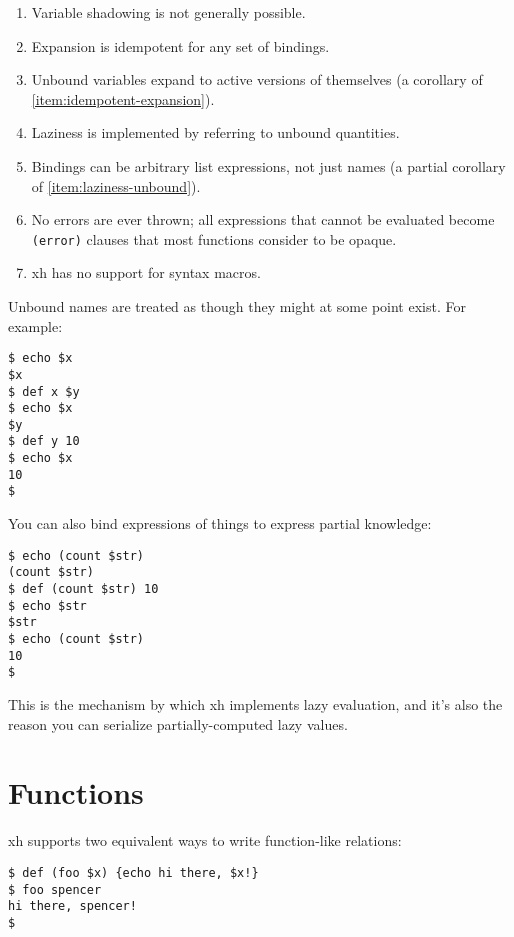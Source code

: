 \documentclass{report}
\begin{document}
\begin{enumerate}
\item{Variable shadowing is not generally possible.}
       \label{item:no-variable-shadowing}
\item{Expansion is idempotent for any set of bindings.}
       \label{item:idempotent-expansion}
\item{Unbound variables expand to active versions of themselves (a}
       corollary of \ref{item:idempotent-expansion}).
       \label{item:unbound-expansion}
\item{Laziness is implemented by referring to unbound quantities.}
       \label{item:laziness-unbound}
\item{Bindings can be arbitrary list expressions, not just names (a}
       partial corollary of \ref{item:laziness-unbound}).
       \label{item:arbitrary-bindings}
\item{No errors are ever thrown; all expressions that cannot be evaluated}
       become \verb|(error)| clauses that most functions consider to be
       opaque.
       \label{item:no-errors}
\item{xh has no support for syntax macros.}
       \label{item:no-macros}
\end{enumerate}

  Unbound names are treated as though they might at some point exist. For
  example:

\begin{verbatim}
$ echo $x
$x
$ def x $y
$ echo $x
$y
$ def y 10
$ echo $x
10
$
\end{verbatim}

  You can also bind expressions of things to express partial knowledge:

\begin{verbatim}
$ echo (count $str)
(count $str)
$ def (count $str) 10
$ echo $str
$str
$ echo (count $str)
10
$
\end{verbatim}

  This is the mechanism by which xh implements lazy evaluation, and it's also
  the reason you can serialize partially-computed lazy values.

\chapter{Functions}\label{chp:functions}
  xh supports two equivalent ways to write function-like relations:

\begin{verbatim}
$ def (foo $x) {echo hi there, $x!}
$ foo spencer
hi there, spencer!
$
\end{verbatim}
\end{document}
